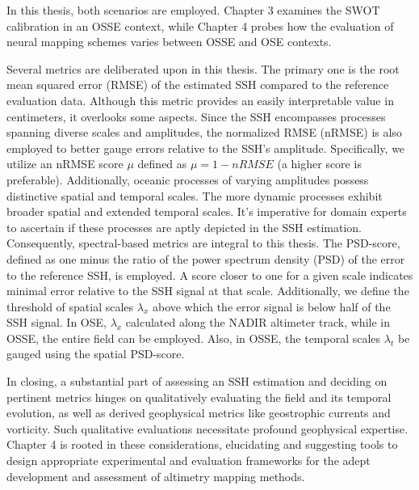 \begin{bibunit}
In this thesis, both scenarios are employed. Chapter 3 examines the SWOT calibration in an OSSE context, while Chapter 4 probes how the evaluation of neural mapping schemes varies between OSSE and OSE contexts.

Several metrics are deliberated upon in this thesis. The primary one is the root mean squared error (RMSE) of the estimated SSH compared to the reference evaluation data. Although this metric provides an easily interpretable value in centimeters, it overlooks some aspects. Since the SSH encompasses processes spanning diverse scales and amplitudes, the normalized RMSE (nRMSE) is also employed to better gauge errors relative to the SSH's amplitude. Specifically, we utilize an nRMSE score $\mu$ defined as $\mu=1−nRMSE$ (a higher score is preferable). Additionally, oceanic processes of varying amplitudes possess distinctive spatial and temporal scales. The more dynamic processes exhibit broader spatial and extended temporal scales. It's imperative for domain experts to ascertain if these processes are aptly depicted in the SSH estimation. Consequently, spectral-based metrics are integral to this thesis. The PSD-score, defined as one minus the ratio of the power spectrum density (PSD) of the error to the reference SSH, is employed. A score closer to one for a given scale indicates minimal error relative to the SSH signal at that scale. Additionally, we define the threshold of spatial scales $\lambda_x$ above which the error signal is below half of the SSH signal. In OSE, $\lambda_x$ calculated along the NADIR altimeter track, while in OSSE, the entire field can be employed. Also, in OSSE, the temporal scales $\lambda_t$ be gauged using the spatial PSD-score.

In closing, a substantial part of assessing an SSH estimation and deciding on pertinent metrics hinges on qualitatively evaluating the field and its temporal evolution, as well as derived geophysical metrics like geostrophic currents and vorticity. Such qualitative evaluations necessitate profound geophysical expertise. Chapter 4 is rooted in these considerations, elucidating and suggesting tools to design appropriate experimental and evaluation frameworks for the adept development and assessment of altimetry mapping methods.




\end{bibunit}
